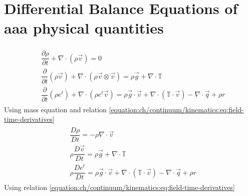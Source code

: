 \documentclass[letterpaper,10pt,english]{jupyterBook}
\begin{document}
\section{Differential Balance Equations of aaa physical quantities}
\label{\detokenize{ch/continuum/balance-primary-differential:differential-balance-equations-of-aaa-physical-quantities}}\label{\detokenize{ch/continuum/balance-primary-differential:continuum-governing-equations-primary-integral}}\label{\detokenize{ch/continuum/balance-primary-differential::doc}}
\sphinxAtStartPar
{}
\begin{equation*}
\begin{split}\begin{aligned}
 & \dfrac{\partial \rho }{\partial t} + \nabla \cdot \left( \rho \vec{v} \right) = 0 \\
 & \dfrac{\partial }{\partial t} \left( \rho \vec{v} \right) +  \nabla \cdot \left( \rho \vec{v} \otimes \vec{v} \right) = \rho \vec{g} + \nabla \cdot \mathbb{T} \\
 & \dfrac{\partial}{\partial t}  \left( \rho e^t \right) + \nabla \cdot \left( \rho e^t \vec{v} \right) = \rho \vec{g} \cdot \vec{v} + \nabla \cdot \left( \mathbb{T} \cdot \vec{v} \right) - \nabla \cdot \vec{q} + \rho r
\end{aligned}\end{split}
\end{equation*}
\sphinxAtStartPar
{} Using mass equation and relation \eqref{equation:ch/continuum/kinematics:eq:field-time-derivatives}
\begin{equation*}
\begin{split}\begin{aligned}
 &      \dfrac{D \rho   }{D t} = - \rho \nabla \cdot \vec{v} \\
 & \rho \dfrac{D \vec{v}}{D t} = \rho \vec{g} + \nabla \cdot \mathbb{T} \\
 & \rho \dfrac{D e^t    }{D t} = \rho \vec{g} \cdot \vec{v} + \nabla \cdot \left( \mathbb{T} \cdot \vec{v} \right) - \nabla \cdot \vec{q} + \rho r
\end{aligned}\end{split}
\end{equation*}
\sphinxAtStartPar
{} Using relation \eqref{equation:ch/continuum/kinematics:eq:field-time-derivatives}
\end{document}
